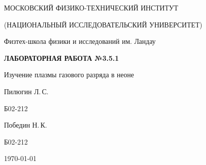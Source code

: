 
\begin{center}
    {
        \MakeUppercase{Московский физико-технический институт}

        \MakeUppercase{(Национальный исследовательский университет)}
    }

    {
        Физтех-школа физики и исследований им. Ландау
    }
    
    \vspace{200pt}
    {
        \Huge
        \bfseries
        \MakeUppercase{Лабораторная работа №3.5.1}
    }

    \vspace{24pt}
    {
        \Large
        Изучение плазмы газового разряда в неоне
    }

    \vspace{24pt}
    {
        \large
        Пилюгин Л.\,С.

        Б02-212
    }

    {
        \large
        Победин Н.\,К.

        Б02-212
    }

    \vspace{2pt}
    {
        \large
        \today
    }
\end{center}

\newpage
{}
\setcounter{page}{2}
